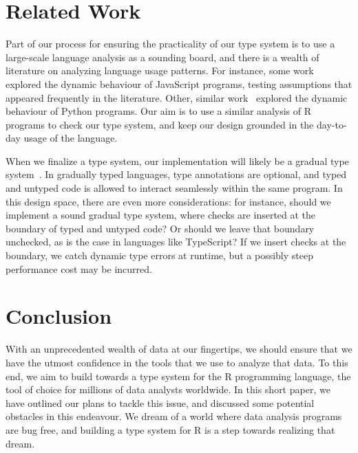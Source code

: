 \documentclass[sigplan,10pt,review,anonymous]{acmart}\settopmatter{printfolios=true,printccs=false,printacmref=false}
\begin{document}

%
%
%
%
\section{Related Work}

Part of our process for ensuring the practicality of our type system is to use a large-scale language analysis as a sounding board, and there is a wealth of literature on analyzing language usage patterns.
For instance, some work~\cite{pldi10a} explored the dynamic behaviour of JavaScript programs, testing assumptions that appeared frequently in the literature.
Other, similar work~\cite{PythonAintDynamic} explored the dynamic behaviour of Python programs.
Our aim is to use a similar analysis of R programs to check our type system, and keep our design grounded in the day-to-day usage of the language.

When we finalize a type system, our implementation will likely be a gradual type system~\cite{tf-dls06}.
In gradually typed languages, type annotations are optional, and typed and untyped code is allowed to interact seamlessly within the same program.
In this design space, there are even more considerations: for instance, should we implement a sound gradual type system, where checks are inserted at the boundary of typed and untyped code?
Or should we leave that boundary unchecked, as is the case in languages like TypeScript?
If we insert checks at the boundary, we catch dynamic type errors at runtime, but a possibly steep~\cite{popl16} performance cost may be incurred.

%
%
%
%
\section{Conclusion}

With an unprecedented wealth of data at our fingertips, we should ensure that we have the utmost confidence in the tools that we use to analyze that data.
To this end, we aim to build towards a type system for the R programming language, the tool of choice for millions of data analysts worldwide. 
In this short paper, we have outlined our plans to tackle this issue, and discussed some potential obstacles in this endeavour.
We dream of a world where data analysis programs are bug free, and building a type system for R is a step towards realizing that dream.

%
%
%


\end{document}

